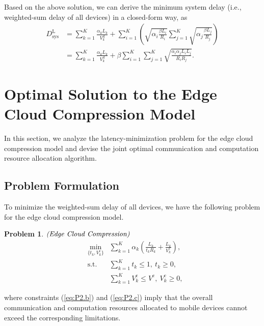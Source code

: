 \documentclass[journal,draftcls,onecolumn,12pt,twoside]{IEEEtran}
\newtheorem{prob}{Problem}
\begin{document}
Based on the above solution, we can derive the minimum system delay (i.e., weighted-sum delay of all devices) in a closed-form way, as
\begin{equation}
	\begin{aligned}
	D_{\text{sys}}^{\text{L}}
        &= \sum_{k=1}^K{ \frac{\alpha_k L_k}{V_k^{\text{d}}} + \sum_{i=1}^K{\left(\sqrt{\alpha_i\frac{\beta L_i}{R_i}}\sum_{j=1}^K{\sqrt{\alpha_j\frac{\beta L_j}{R_j}}}\right)}}\\
        &= \sum_{k=1}^K{ \frac{\alpha_k L_k}{V_k^{\text{d}}}} + \beta \sum_{i=1}^K{\sum_{j=1}^K{\sqrt{\frac{\alpha_i \alpha_j L_i L_j}{R_iR_j}}}.}
	\end{aligned} \label{11}
\end{equation}

\section{Optimal Solution to the Edge Cloud Compression Model}
In this section, we analyze the latency-minimization problem for the edge cloud compression model and devise the joint optimal communication and computation resource allocation algorithm.
\subsection{Problem Formulation}
To minimize the weighted-sum delay of all devices, we have the following problem for the edge cloud compression model.
\begin{prob}$\emph{(Edge~Cloud~Compression)}$
    \begin{subequations}
    \begin{eqnarray}
    &\min\limits_{\{t_k, V_k^{\text{c}}\}}&\sum_{k=1}^K \alpha_k \left(\frac{L_k}{t_kR_k}+\frac{L_k}{V_k^{\text{c}}}\right),\label{eq:P2.a}\\
    &{\text{s.t.}}&\sum_{k=1}^K t_k \le 1,~t_k \ge 0, \label{eq:P2.b}\\
    &&\sum_{k=1}^K V_k^{\text{c}} \le V^{\text{c}},~V_k^{\text{c}} \ge 0, \label{eq:P2.c}
    \end{eqnarray}
    \end{subequations}
\end{prob}
where constraints ({\ref{eq:P2.b}}) and ({\ref{eq:P2.c}}) imply that the overall communication and computation resources allocated to mobile devices cannot exceed the corresponding limitations.
\end{document}
